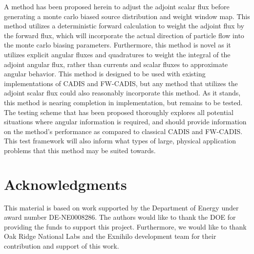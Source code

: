 \documentclass{mc2015}
\begin{document}
A method has been proposed herein to adjust the adjoint scalar flux before generating a monte carlo biased source distribution and weight window map. 
This method utilizes a deterministic forward calculation to weight the adjoint flux by the forward flux, which will incorporate the actual direction of particle flow into the monte carlo biasing parameters. 
Furthermore, this method is novel as it utilizes explicit angular fluxes and quadratures to weight the integral of the adjoint angular flux, rather than currents and scalar fluxes to approximate angular behavior. 
This method is designed to be used with existing implementations of CADIS and FW-CADIS, but any method that utilizes the adjoint scalar flux could also reasonably incorporate this method. 
As it stands, this method is nearing completion in implementation, but remains to be tested. 
The testing scheme that has been proposed thoroughly explores all potential situations where angular information is required, and should provide information on the method's performance as compared to classical CADIS and FW-CADIS. 
This test framework will also inform what types of large, physical application problems that this method may be suited towards. 


\section{Acknowledgments}

This material is based on work supported by the Department of Energy under award number DE-NE0008286. The authors would like to thank the DOE for providing the funds to support this project. Furthermore, we would like to thank Oak Ridge National Labs and the Exnihilo development team for their contribution and support of this work. 

\setlength{\baselineskip}{12pt}




\end{document}
